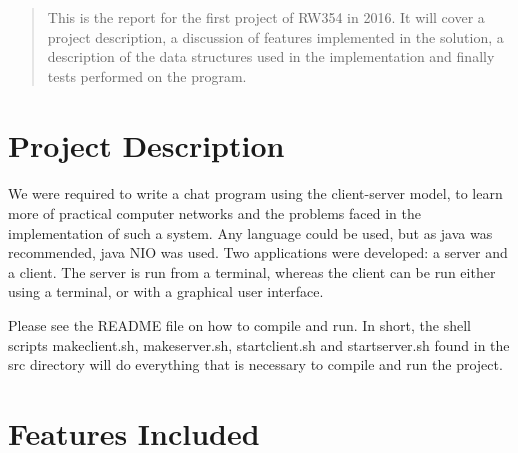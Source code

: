 \documentclass[12pt]{article}
\begin{document}
\maketitle

\begin{abstract}
This is the report for the first project of RW354 in 2016. It will cover a
project description, a discussion of features implemented in the solution, 
a description of the data structures used in the implementation and finally
tests performed on the program.  
\end{abstract}

\section{Project Description}

\paragraph{}
We were required to write a chat program using the client-server model, to learn
more of practical computer networks and the problems faced in the implementation
of such a system. Any language could be used, but as java was recommended, java
NIO was used. Two applications were developed:  a server and a client.  The
server is run from a terminal, whereas the client can be run either using a
terminal, or with a graphical user interface.  

Please see the README file on how to compile and run.  In short, the
shell scripts makeclient.sh, makeserver.sh, startclient.sh and startserver.sh
found in the src directory will do everything that is necessary to compile and run the project.

\section{Features Included}
\end{document}
